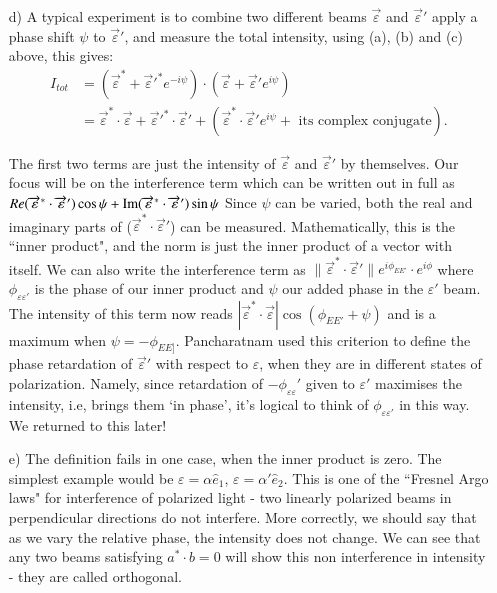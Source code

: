 \begin{itemize}
\item[d)] A typical experiment is to combine two different beams $\overrightarrow{\varepsilon}$ and $\overrightarrow{\varepsilon}'$ apply a phase
shift $\psi$ to $\overrightarrow{\varepsilon}'$, and measure the total intensity, using (a), (b) and (c) above, this
gives:
\begin{align*}
I_{tot} & = (\overrightarrow{\varepsilon}^{\ast} + \overrightarrow{\varepsilon}'^{\ast} e^{-i\psi})  \cdot (\overrightarrow{\varepsilon} + \overrightarrow{\varepsilon}' e^{i\psi})\\
& = \overrightarrow{\varepsilon}^{\ast} \cdot \overrightarrow{\varepsilon} + \overrightarrow{\varepsilon}'^{\ast}  \cdot \overrightarrow{\varepsilon}' + (\overrightarrow{\varepsilon}^{\ast} \cdot \overrightarrow{\varepsilon}' e^{i\psi}  + \text{ its complex conjugate}).
\end{align*}

The first two terms are just the intensity of $\overrightarrow{\varepsilon}$ and $\overrightarrow{\varepsilon}'$ by themselves. Our focus will be on the interference term which can be written out in full as $Re(\overrightarrow{\varepsilon}^{\ast}  \cdot \overrightarrow{\varepsilon}') \cos \psi + \operatorname{\mathrm{Im}} (\overrightarrow{\varepsilon}^{\ast} \cdot \overrightarrow{\varepsilon}') \sin \psi$
Since $\psi$ can be varied, both the real and imaginary parts of ($\overrightarrow{\varepsilon}^{\ast} \cdot \overrightarrow{\varepsilon}'$) can be
measured. Mathematically, this is the ``inner product", and the norm is just
the inner product of a vector with itself. We can also write the interference
term as $\| \overrightarrow{\varepsilon}^{\ast}  \cdot \overrightarrow{\varepsilon}'\| e^{i\phi_{EE'}} \cdot e^{i\phi}$ where $\phi_{\varepsilon \varepsilon'}$ is the phase of our inner product and $\psi$ our added phase in the $\varepsilon'$ beam. The intensity of this term now reads
$| \overrightarrow{\varepsilon}^{\ast} \cdot \overrightarrow{\varepsilon}| \cos (\phi_{EE'} + \psi)$ and is a maximum when $\psi = -\phi_{EE]}$. Pancharatnam
used this criterion to define the phase retardation of $\overrightarrow{\varepsilon}'$ with respect to $\varepsilon$, when
they are in different states of polarization. Namely, since retardation of $-\phi_{\varepsilon \varepsilon}'$ 
given to $\varepsilon'$ maximises the intensity, i.e, brings them `in phase', it's logical to
think of $\phi_{\varepsilon \varepsilon'}$ in this way. We returned to this later!

\item[e)] The definition fails in one case, when the inner product is zero. The simplest
example would be $\varepsilon = \alpha \hat{e}_1$, $\varepsilon = \alpha' \hat{e}_2$. This is one of the ``Fresnel Argo laws" for
interference of polarized light - two linearly polarized beams in perpendicular
directions do not interfere. More correctly, we should say that as we vary the
relative phase, the intensity does not change. We can see that any two beams
satisfying $a^{\ast} \cdot b = 0$ will show this non interference in intensity - they are called
orthogonal.


\end{itemize}
